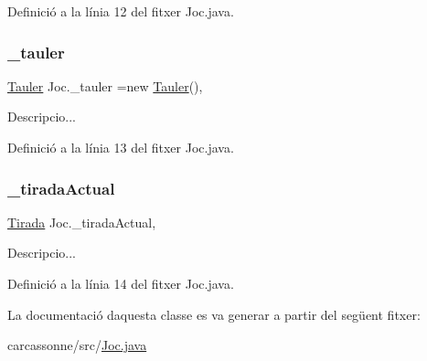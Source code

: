 Definició a la línia 12 del fitxer Joc.\+java.

\mbox{\label{class_joc_a0e45f68f18198669176e3f46b05a41ac}} 
\subsubsection{\texorpdfstring{\+\_\+tauler}{\_tauler}}
{\footnotesize\ttfamily \mbox{\hyperlink{class_tauler}{Tauler}} Joc.\+\_\+tauler =new \mbox{\hyperlink{class_tauler}{Tauler}}()\hspace{0.3cm}{\ttfamily [static]}, {\ttfamily [private]}}



Descripcio... 



Definició a la línia 13 del fitxer Joc.\+java.

\mbox{\label{class_joc_a6713774e2d5d01daaef695af3cb55474}} 
\subsubsection{\texorpdfstring{\+\_\+tirada\+Actual}{\_tiradaActual}}
{\footnotesize\ttfamily \mbox{\hyperlink{class_tirada}{Tirada}} Joc.\+\_\+tirada\+Actual\hspace{0.3cm}{\ttfamily [static]}, {\ttfamily [private]}}



Descripcio... 



Definició a la línia 14 del fitxer Joc.\+java.



La documentació d\textquotesingle{}aquesta classe es va generar a partir del següent fitxer\+:\begin{DoxyCompactItemize}
\item 
carcassonne/src/\mbox{\hyperlink{_joc_8java}{Joc.\+java}}\end{DoxyCompactItemize}

